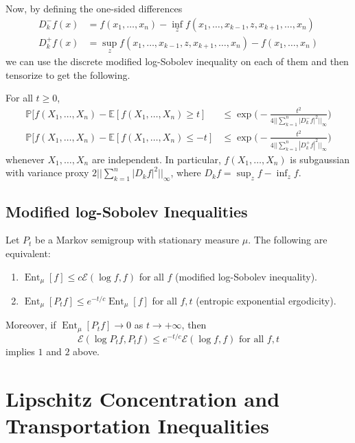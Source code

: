 \documentclass{article}
\DeclareMathOperator{\Ent}{Ent}
\begin{document}
  Now, by defining the one-sided differences 
  \begin{align*}
      D_k^- f (x) & = f(x_1, \ldots, x_n) - \inf_z f (x_1, \ldots, x_{k-1}, z, x_{k+1}, \ldots, x_n) \\
      D_k^+ f (x) & = \sup_z f (x_1, \ldots, x_{k-1}, z, x_{k+1}, \ldots, x_n) - f(x_1, \ldots, x_n) 
  \end{align*}
  we can use the discrete modified log-Sobolev inequality on each of them and then tensorize to get the following. 

  \begin{theorem}
  For all $t \geq 0$, 
  \begin{align*}
      \mathbb{P}[ f(X_1, \ldots, X_n) - \mathbb{E}[f(X_1, \ldots, X_n) \geq t] & \leq \exp \bigg( -\frac{t^2}{4 || \sum_{k=1}^n |D_k^- f|^2||_\infty} \bigg) \\
      \mathbb{P}[ f(X_1, \ldots, X_n) - \mathbb{E}[f(X_1, \ldots, X_n) \leq -t] & \leq \exp \bigg( -\frac{t^2}{4 || \sum_{k=1}^n |D_k^+ f|^2||_\infty} \bigg) 
  \end{align*}
  whenever $X_1, \ldots, X_n$ are independent. In particular, $f(X_1, \ldots, X_n)$ is subgaussian with variance proxy $2 ||\sum_{k=1}^n |D_k f|^2 ||_\infty$, where $D_k f = \sup_z f - \inf_z f$. 
  \end{theorem}

  \subsection{Modified log-Sobolev Inequalities}

  \begin{theorem}
  Let $P_t$ be a Markov semigroup with stationary measure $\mu$. The following are equivalent: 
  \begin{enumerate}
      \item $\Ent_\mu [f] \leq c \mathcal{E}(\log f, f)$ for all $f$ (modified log-Sobolev inequality). 
      \item $\Ent_\mu [P_t f] \leq e^{-t/c} \Ent_\mu [f]$ for all $f, t$ (entropic exponential ergodicity). 
  \end{enumerate}
  Moreover, if $\Ent_\mu [P_t f] \rightarrow 0$ as $t \rightarrow +\infty$, then 
  \[\mathcal{E}(\log P_t f, P_t f) \leq e^{-t/c} \mathcal{E}(\log f, f) \text{ for all } f, t\]
  implies $1$ and $2$ above. 
  \end{theorem}

\section{Lipschitz Concentration and Transportation Inequalities}
\end{document}
